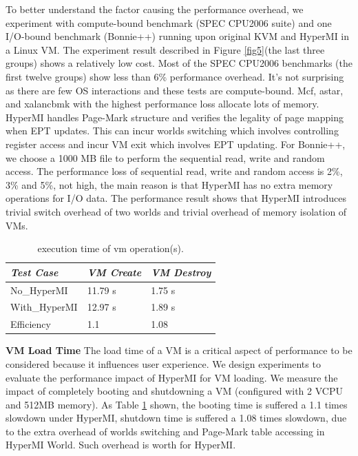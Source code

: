 \documentclass[conference]{IEEEtran}
\begin{document}
To better understand the factor causing the performance overhead, we experiment with compute-bound benchmark (SPEC CPU2006 suite) and one I/O-bound benchmark (Bonnie++) running upon original KVM and HyperMI in a Linux VM. The experiment result described in Figure \ref{fig5}(the last three groups) shows a relatively low cost. Most of the SPEC CPU2006 benchmarks (the first twelve groups) show less than 6\% performance overhead. It's not surprising as there are few OS interactions and these tests are compute-bound. Mcf, astar, and xalancbmk with the highest performance loss allocate lots of memory. HyperMI handles Page-Mark structure and verifies the legality of page mapping when EPT updates. This can incur worlds switching which involves controlling register access and incur VM exit which involves EPT updating.
 For Bonnie++, we choose a 1000 MB file to perform the sequential read, write and random access. The performance loss of sequential read, write and random access is 2\%, 3\% and 5\%, not high, the main reason is that HyperMI has no extra memory operations for I/O data. The performance result shows that HyperMI introduces trivial switch overhead of two worlds and trivial overhead of memory isolation of VMs.

\begin{table}
\centering
\caption{execution time of vm operation(s).}\label{tabvm}
\begin{tabular}{p{2cm}|p{1.4cm}|p{1.5cm}}
\hline
{\itshape\bfseries  Test Case} & {\itshape\bfseries VM Create} & {\itshape\bfseries VM Destroy} \\
\hline
No\_HyperMI & 11.79 s &  1.75 s\\
\hline
With\_HyperMI & 12.97 s & 1.89 s\\ 
\hline
Efficiency & 1.1 & 1.08 \\
\hline
\end{tabular}
\end{table}


\textbf {VM Load Time}
The load time of a VM is a critical aspect of performance to be considered because it influences user experience. We design experiments to evaluate the performance impact of HyperMI for VM loading.
 We measure the impact of completely booting and shutdowning a VM (configured with 2 VCPU and 512MB memory). As Table \ref{tabvm} shown, the booting time is suffered a 1.1 times slowdown under HyperMI, shutdown time is suffered a 1.08 times slowdown, due to the extra overhead of worlds switching and Page-Mark table accessing in HyperMI World. Such overhead is worth for HyperMI.
\end{document}
